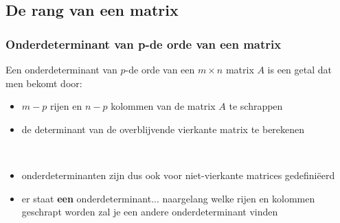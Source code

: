 \subsection{De rang van een matrix}

\subsubsection{Onderdeterminant van p-de orde van een matrix}

Een onderdeterminant van $p$-de orde van een $m \times n$ matrix $A$ is een getal dat men bekomt door:
\begin{itemize}
	\item $m-p$ rijen en $n-p$ kolommen van de matrix $A$ te schrappen
	\item de determinant van de overblijvende vierkante matrix te berekenen
\end{itemize}


\begin{opmerking}
	\ \\
	\begin{itemize}
	\item onderdeterminanten zijn dus ook voor niet-vierkante matrices gedefini\"{e}erd
	\item er staat {\bf een} onderdeterminant... naargelang welke rijen en kolommen geschrapt worden zal je een andere onderdeterminant vinden
\end{itemize}
\end{opmerking}


